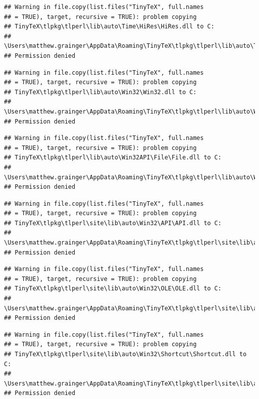 \documentclass[]{article}
\begin{document}
\begin{verbatim}
## Warning in file.copy(list.files("TinyTeX", full.names
## = TRUE), target, recursive = TRUE): problem copying
## TinyTeX\tlpkg\tlperl\lib\auto\Time\HiRes\HiRes.dll to C:
## \Users\matthew.grainger\AppData\Roaming\TinyTeX\tlpkg\tlperl\lib\auto\Time\HiRes\HiRes.dll:
## Permission denied
\end{verbatim}

\begin{verbatim}
## Warning in file.copy(list.files("TinyTeX", full.names
## = TRUE), target, recursive = TRUE): problem copying
## TinyTeX\tlpkg\tlperl\lib\auto\Win32\Win32.dll to C:
## \Users\matthew.grainger\AppData\Roaming\TinyTeX\tlpkg\tlperl\lib\auto\Win32\Win32.dll:
## Permission denied
\end{verbatim}

\begin{verbatim}
## Warning in file.copy(list.files("TinyTeX", full.names
## = TRUE), target, recursive = TRUE): problem copying
## TinyTeX\tlpkg\tlperl\lib\auto\Win32API\File\File.dll to C:
## \Users\matthew.grainger\AppData\Roaming\TinyTeX\tlpkg\tlperl\lib\auto\Win32API\File\File.dll:
## Permission denied
\end{verbatim}

\begin{verbatim}
## Warning in file.copy(list.files("TinyTeX", full.names
## = TRUE), target, recursive = TRUE): problem copying
## TinyTeX\tlpkg\tlperl\site\lib\auto\Win32\API\API.dll to C:
## \Users\matthew.grainger\AppData\Roaming\TinyTeX\tlpkg\tlperl\site\lib\auto\Win32\API\API.dll:
## Permission denied
\end{verbatim}

\begin{verbatim}
## Warning in file.copy(list.files("TinyTeX", full.names
## = TRUE), target, recursive = TRUE): problem copying
## TinyTeX\tlpkg\tlperl\site\lib\auto\Win32\OLE\OLE.dll to C:
## \Users\matthew.grainger\AppData\Roaming\TinyTeX\tlpkg\tlperl\site\lib\auto\Win32\OLE\OLE.dll:
## Permission denied
\end{verbatim}

\begin{verbatim}
## Warning in file.copy(list.files("TinyTeX", full.names
## = TRUE), target, recursive = TRUE): problem copying
## TinyTeX\tlpkg\tlperl\site\lib\auto\Win32\Shortcut\Shortcut.dll to C:
## \Users\matthew.grainger\AppData\Roaming\TinyTeX\tlpkg\tlperl\site\lib\auto\Win32\Shortcut\Shortcut.dll:
## Permission denied
\end{verbatim}
\end{document}
